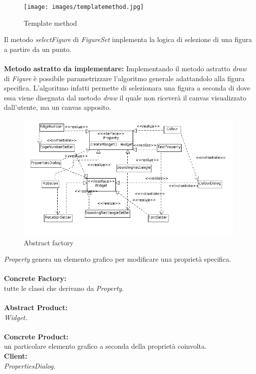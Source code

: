 \begin{figure}[!ht]
\centering
\texttt{[image: images/templatemethod.jpg]}
\caption{Template method}
\end{figure}
Il metodo \textit{selectFigure} di \textit{FigureSet} implementa la logica di selezione di una figura a partire da un punto.\\ \\
\textbf{Metodo astratto da implementare:}
Implementando il metodo astratto \textit{draw} di \textit{Figure} \`e possibile parametrizzare l'algoritmo generale adattandolo alla figura specifica. L'algoritmo infatti permette di selezionara una figura a seconda di dove essa viene disegnata dal metodo \textit{draw} il quale non ricever\`a il canvas visualizzato dall'utente, ma un canvas apposito.
\newpage
{} 
\begin{figure}[!ht]
\centering
\includegraphics[scale=0.5]{images/absfactory.png}
\caption{Abstract factory}
\end{figure}
\textit{Property} genera un elemento grafico per modificare una propriet\`a specifica.\\ \\
\textbf{Concrete Factory: }\\
tutte le classi che derivano da \textit{Property}. \\ \\
\textbf{Abstract Product: }\\
\textit{Widget.}\\ \\
\textbf{Concrete Product: }\\
un particolare elemento grafico a seconda della propriet\`a coinvolta. \\
\textbf{Client:}\\
\textit{PropertiesDialog.}

